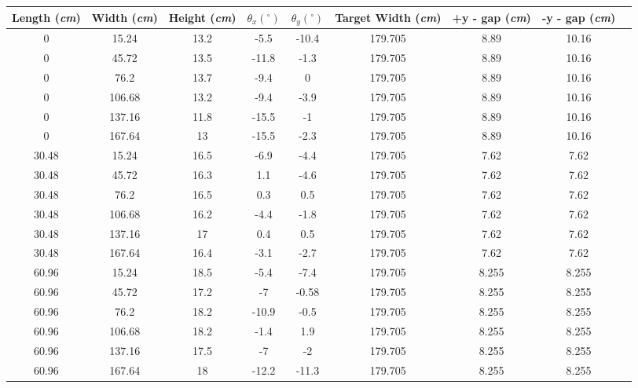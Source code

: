 \begin{landscape}
\begin{center}
\begin{tabular}{| c | c | c | c | c | c | c | c | c |} \hline
Length (\textit{cm}) & Width (\textit{cm}) & Height (\textit{cm}) & $\theta_{x} (^{\circ})$ & $\theta_{y} (^{\circ})$ & Target Width (\textit{cm}) & +y - gap (\textit{cm}) & -y - gap (\textit{cm}) \\
\hline \hline
0 & 15.24 & 13.2 & -5.5 & -10.4 & 179.705 & 8.89 & 10.16 \\
0 & 45.72 & 13.5 & -11.8 & -1.3 & 179.705 & 8.89 & 10.16 \\
0 & 76.2 & 13.7 & -9.4 & 0 & 179.705 & 8.89 & 10.16 \\
0 & 106.68 & 13.2 & -9.4 & -3.9 & 179.705 & 8.89 & 10.16 \\
0 & 137.16 & 11.8 & -15.5 & -1 & 179.705 & 8.89 & 10.16 \\
0 & 167.64 & 13 & -15.5 & -2.3 & 179.705 & 8.89 & 10.16 \\
30.48 & 15.24 & 16.5 & -6.9 & -4.4 & 179.705 & 7.62 & 7.62 \\
30.48 & 45.72 & 16.3 & 1.1 & -4.6 & 179.705 & 7.62 & 7.62 \\
30.48 & 76.2 & 16.5 & 0.3 & 0.5 & 179.705 & 7.62 & 7.62 \\
30.48 & 106.68 & 16.2 & -4.4 & -1.8 & 179.705 & 7.62 & 7.62 \\
30.48 & 137.16 & 17 & 0.4 & 0.5 & 179.705 & 7.62 & 7.62 \\
30.48 & 167.64 & 16.4 & -3.1 & -2.7 & 179.705 & 7.62 & 7.62 \\
60.96 & 15.24 & 18.5 & -5.4 & -7.4 & 179.705 & 8.255 & 8.255 \\
60.96 & 45.72 & 17.2 & -7 & -0.58 & 179.705 & 8.255 & 8.255 \\
60.96 & 76.2 & 18.2 & -10.9 & -0.5 & 179.705 & 8.255 & 8.255 \\
60.96 & 106.68 & 18.2 & -1.4 & 1.9 & 179.705 & 8.255 & 8.255 \\
60.96 & 137.16 & 17.5 & -7 & -2 & 179.705 & 8.255 & 8.255 \\
60.96 & 167.64 & 18 & -12.2 & -11.3 & 179.705 & 8.255 & 8.255 \\

\end{tabular}
\end{center}
\end{landscape}
